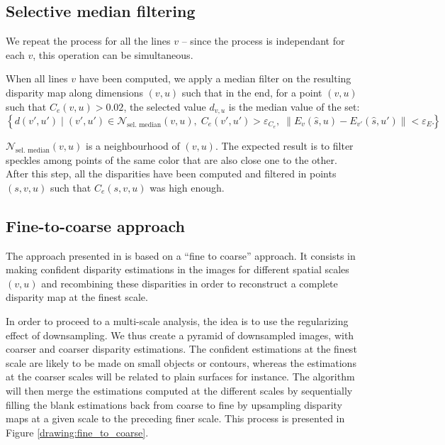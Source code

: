 \documentclass{article}
\newcommand{\norm}[1]{\left\lVert#1\right\rVert}
\theoremstyle{definition}
\begin{document}
\subsection{Selective median filtering}


We repeat the process for all the lines $v$ -- since the process is independant for each $v$, this operation can be simultaneous.


When all lines $v$ have been computed, we apply a median filter on the resulting disparity map along dimensions $(v, u)$ such that in the end, for a point $(v, u)$ such that $C_e (v, u) > 0.02$, the selected value $d_{v, u}$ is the median value of the set:
\[ \left\{ d (v', u') \; | \; (v', u') \in \mathcal{N}_\text{sel. median}(v, u), \; C_e(v', u') > \varepsilon_{C_e}, \; \norm{E_{v}(\widehat{s}, u) - E_{v'}(\widehat{s}, u')} < \varepsilon_{E} \right\}.\]

$\mathcal{N}_\text{sel. median}(v, u)$ is a neighbourhood of $(v, u)$. The expected result is to filter speckles among points of the same color that are also close one to the other. After this step, all the disparities have been computed and filtered in points $(s, v, u)$ such that $C_e(s, v, u)$ was high enough.


\subsection{Fine-to-coarse approach}


The approach presented in \cite{art:kim13:lfields} is based on a ``fine to coarse'' approach. It consists in making confident disparity estimations in the images for different spatial scales $(v, u)$ and recombining these disparities in order to reconstruct a complete disparity map at the finest scale.


In order to proceed to a multi-scale analysis, the idea is to use the regularizing effect of downsampling. We thus create a pyramid of downsampled images, with coarser and coarser disparity estimations. The confident estimations at the finest scale are likely to be made on small objects or contours, whereas the estimations at the coarser scales will be related to plain surfaces for instance. The algorithm will then merge the estimations computed at the different scales by sequentially filling the blank estimations back from coarse to fine by upsampling disparity maps at a given scale to the preceding finer scale. This process is presented in Figure \ref{drawing:fine_to_coarse}.
\end{document}
